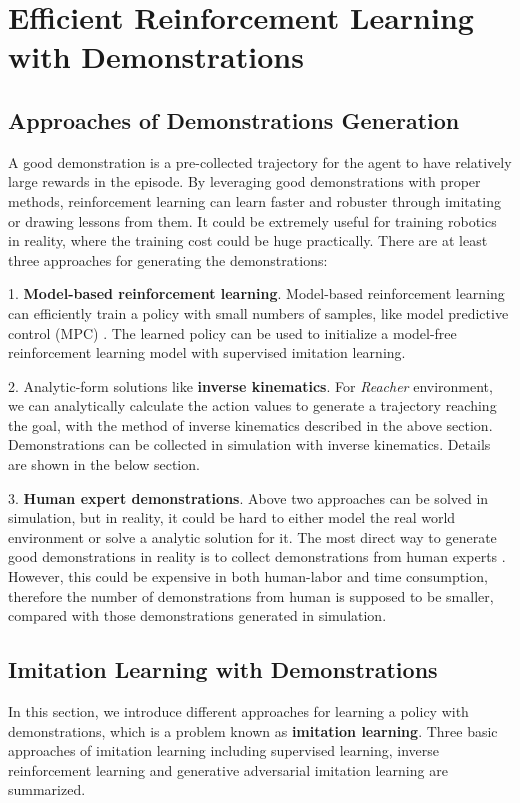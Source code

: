 \documentclass{article}
\begin{document}
\section{Efficient Reinforcement Learning with Demonstrations}

\subsection{Approaches of Demonstrations Generation}
A good demonstration is a pre-collected trajectory for the agent to have relatively large rewards in the episode. By leveraging good demonstrations with proper methods, reinforcement learning can learn faster and robuster through imitating or drawing lessons from them. It could be extremely useful for training robotics in reality, where the training cost could be huge practically.
There are at least three approaches for generating the demonstrations:

1. \textbf{Model-based reinforcement learning}. Model-based reinforcement learning can efficiently train a policy with small numbers of samples, like model predictive control (MPC) \cite{nagabandi2018neural}. The learned policy can be used to initialize a model-free reinforcement learning model with supervised imitation learning.

2. Analytic-form solutions like \textbf{inverse kinematics}. For \textit{Reacher} environment, we can analytically calculate the action values to generate a trajectory reaching the goal, with the method of inverse kinematics described in the above section. Demonstrations can be collected in simulation with inverse kinematics. Details are shown in the below section.

3. \textbf{Human expert demonstrations}. Above two approaches can be solved in simulation, but in reality, it could be hard to either model the real world environment or solve a analytic solution for it. The most direct way to generate good demonstrations in reality is to collect demonstrations from human experts \cite{bojarski2016end}. However, this could be expensive in both human-labor and time consumption, therefore the number of demonstrations from human is supposed to be smaller, compared with those demonstrations generated in simulation.


\subsection{Imitation Learning with Demonstrations}
In this section, we introduce different approaches for learning a policy with demonstrations, which is a problem known as \textbf{imitation learning}. Three basic approaches of imitation learning including supervised learning, inverse reinforcement learning and generative adversarial imitation learning are summarized. 
\end{document}

